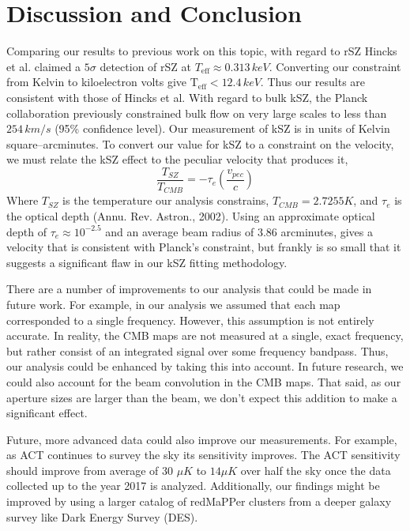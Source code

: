 \documentclass{princeton_astro_thesis}
\begin{document}
\chapter{Discussion and Conclusion}
\par Comparing our results to previous work on this topic, with regard to rSZ Hincks et al. claimed a $5\sigma$ detection of rSZ at $T_\mathrm{eff}\approx 0.313\, keV$. Converting our constraint from Kelvin to kiloelectron volts give $\mathrm{T_{eff}}<12.4 \, keV$. Thus our results are consistent with those of Hincks et al. With regard to bulk kSZ, the Planck collaboration previously constrained bulk flow on very large scales to less than $254\, km/s$ (95\% confidence level). Our measurement of kSZ is in units of Kelvin square--arcminutes. To convert our value for kSZ to a constraint on the velocity, we must relate the kSZ effect to the peculiar velocity that produces it,
\begin{equation}
\frac{T_{SZ}}{T_{CMB}}=-\tau_e\left(\frac{v_{pec}}{c}\right)
\end{equation}
Where $T_{SZ}$ is the temperature our analysis constrains, $T_{CMB}=2.7255 K$, and $\tau_e$ is the optical depth (Annu. Rev. Astron., 2002). Using an approximate optical depth of $\tau_e\approx10^{-2.5}$ and an average beam radius of $3.86$ arcminutes, gives a velocity that is consistent with Planck's constraint, but frankly is so small that it suggests a significant flaw in our kSZ fitting methodology.
\par There are a number of improvements to our analysis that could be made in future work. For example, in our analysis we assumed that each map corresponded to a single frequency. However, this assumption is not entirely accurate. In reality, the CMB maps are not measured at a single, exact frequency, but rather consist of an integrated signal over some frequency bandpass. Thus, our analysis could be enhanced by taking this into account. In future research, we could also account for the beam convolution in the CMB maps. That said, as our aperture sizes are larger than the beam, we don't expect this addition to make a significant effect.
\par Future, more advanced data could also improve our measurements. For example, as ACT continues to survey the sky its sensitivity improves. The ACT sensitivity should improve from average of 30 $\mu K$ to $14 \mu K$ over half the sky once the data collected up to the year 2017 is analyzed. Additionally, our findings might be improved by using a larger catalog of redMaPPer clusters from a deeper galaxy survey like Dark Energy Survey (DES).
\end{document}
